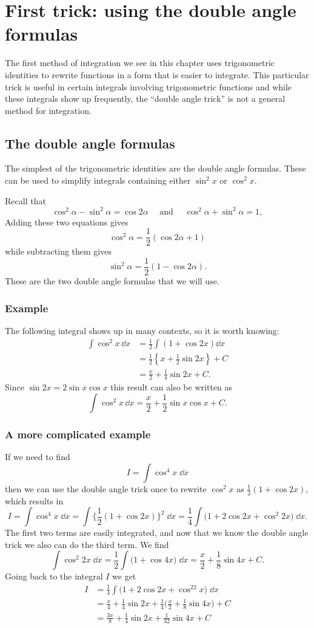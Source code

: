 \section{First trick: using the double angle formulas} %
\label{sec:01double-angle-trick}
The first method of integration we see in this chapter uses trigonometric
identities to rewrite functions in a form that is easier to integrate.  This
particular trick is useful in certain integrals involving trigonometric
functions and while these integrals show up frequently, the ``double angle
trick'' is not a general method for integration.

\subsection{The double angle formulas} %
The simplest of the trigonometric identities are the double angle formulas.
These can be used to simplify integrals containing either $\sin^2 x$ or $\cos^2
x$.

Recall that
\[
\cos^2 \alpha-\sin^2\alpha = \cos 2\alpha \quad\text{ and }\quad \cos^2\alpha +
\sin^2\alpha =1,
\]
Adding these two equations gives
\[
\cos^2 \alpha =\frac12\left(\cos2\alpha+1\right)
\]
while subtracting them gives
\[
\sin^2 \alpha = \frac 12 \left(1-\cos2\alpha\right).
\]
These are the two double angle formulas that we will use.

\subsubsection{Example} The following integral shows up in many contexts, so it
is worth knowing:
\begin{align*}
  \int \cos^2 x\,\dd x
  &= \frac12 \int (1+\cos 2x)\dd x\\
  &= \frac12 \left\{x+\frac 12 \sin 2x\right\} +C\\
  &=\frac x2 +\frac 14 \sin 2x + C.
\end{align*}
Since $\sin2x=2\sin x\cos x$ this result can also be written as
\[
\int \cos^2 x\,\dd x = \frac x2+\frac12 \sin x\cos x +C.
\]
\subsubsection{A more complicated example} If we need to find
\[
I=\int \cos^4x \; \dd x
\]
then we can use the double angle trick once to rewrite $\cos^2 x$ as
$\frac12(1+\cos 2x)$, which results in
\[
I=\int \cos^4x \; \dd x
=\int\bigl\{\frac12(1+\cos 2x)\bigr\}^2 \;\dd x
=\frac14 \int \bigl(1+2\cos 2x + \cos^2 2x\bigr)\; \dd x.
\]
The first two terms are easily integrated, and now that we know the double angle
trick we also can do the third term.  We find
\[
\int\cos^2 2x\;\dd x
= \frac12 \int \bigl(1+\cos 4x\bigr)\;\dd x
= \frac x2 + \frac18\sin 4x +C.
\]
Going back to the integral $I$ we get
\begin{align*}
  I
  &= \frac14 \int \bigl(1+2\cos 2x + \cos^22x\bigr)\; \dd x\\
  &= \frac x4 + \frac14\sin 2x +\frac14 \bigl( \frac x2 + \frac 18\sin 4x\bigr) +C\\
  &= \frac {3x}8 + \frac14\sin 2x + \frac 1{32}\sin 4x +C
\end{align*}

